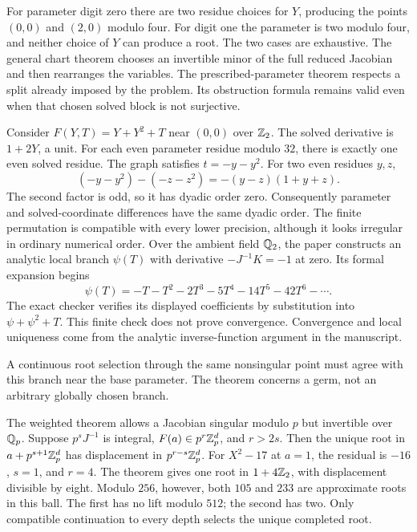 For parameter digit zero there are two residue choices for $Y$, producing the points $(0,0)$ and $(2,0)$ modulo four. For digit one the parameter is two modulo four, and neither choice of $Y$ can produce a root. The two cases are exhaustive.
The general chart theorem chooses an invertible minor of the full reduced Jacobian and then rearranges the variables. The prescribed-parameter theorem respects a split already imposed by the problem. Its obstruction formula remains valid even when that chosen solved block is not surjective.

Consider $F(Y,T)=Y+Y^2+T$ near $(0,0)$ over $\mathbb Z_2$. The solved derivative is $1+2Y$, a unit. For each even parameter residue modulo $32$, there is exactly one even solved residue.
The graph satisfies $t=-y-y^2$. For two even residues $y,z$,
\[
 (-y-y^2)-(-z-z^2)=-(y-z)(1+y+z).
\]
The second factor is odd, so it has dyadic order zero. Consequently parameter and solved-coordinate differences have the same dyadic order. The finite permutation is compatible with every lower precision, although it looks irregular in ordinary numerical order.
Over the ambient field $\mathbb Q_2$, the paper constructs an analytic local branch $\psi(T)$ with derivative $-J^{-1}K=-1$ at zero. Its formal expansion begins
\[
 \psi(T)=-T-T^2-2T^3-5T^4-14T^5-42T^6-\cdots.
\]
The exact checker verifies its displayed coefficients by substitution into $\psi+\psi^2+T$. This finite check does not prove convergence. Convergence and local uniqueness come from the analytic inverse-function argument in the manuscript.

A continuous root selection through the same nonsingular point must agree with this branch near the base parameter. The theorem concerns a germ, not an arbitrary globally chosen branch.

The weighted theorem allows a Jacobian singular modulo $p$ but invertible over $\mathbb Q_p$. Suppose $p^sJ^{-1}$ is integral, $F(a)\in p^r\mathbb Z_p^d$, and $r>2s$. Then the unique root in $a+p^{s+1}\mathbb Z_p^d$ has displacement in $p^{r-s}\mathbb Z_p^d$.
For $X^2-17$ at $a=1$, the residual is $-16$, $s=1$, and $r=4$. The theorem gives one root in $1+4\mathbb Z_2$, with displacement divisible by eight. Modulo $256$, however, both $105$ and $233$ are approximate roots in this ball. The first has no lift modulo $512$; the second has two. Only compatible continuation to every depth selects the unique completed root.

